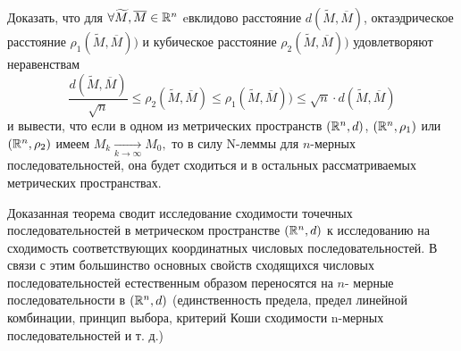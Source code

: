 \documentclass[../../main.tex]{subfiles}
\begin{document}
  \begin{exc}
    Доказать, что для $\forall \widetilde M, \overline{M} \in \mathbb{R}^n$ 
    eвклидово расстояние $d(\widetilde M, \overline{M})$, 
    октаэдрическое расстояние $\rho_1(\widetilde M, \overline{M}))$ 
    и кубическое расстояние $\rho_2(\widetilde M, \overline{M}))$ 
    удовлетворяют неравенствам
    \[
    \frac{d(\widetilde M, \overline{M})}{\sqrt{n}} \leq 
    \rho_2(\widetilde M, \overline{M}) \leq \rho_1(\widetilde M, 
    \overline{M})) \leq \sqrt{n}\cdot d(\widetilde M, \overline{M})
    \]
     и вывести, что если в одном из метрических пространств $(\mathbb{R}^n, 
     d)$, $(\mathbb{R}^n, \rho_1)$ или $(\mathbb{R}^n, \rho_2)$ имеем $M_k 
     \underset{k\rightarrow\infty}{\longrightarrow}  M_0,$ то в силу 
     N-леммы для $n$-мерных последовательностей, она будет сходиться 
     и в остальных рассматриваемых метрических пространствах.
  \end{exc}
  
  \begin{rem}
    Доказанная теорема сводит исследование сходимости точечных 
    последовательностей в метрическом пространстве $(\mathbb{R}^n, d)$ к 
    исследованию на сходимость соответствующих координатных числовых 
    последовательностей.
    В связи с этим большинство основных свойств сходящихся числовых 
    последовательностей естественным образом переносятся на $n$-
    мерные последовательности в $(\mathbb{R}^n, d)$
    (единственность предела, предел линейной комбинации, принцип 
    выбора, критерий Коши сходимости n-мерных последовательностей и 
    т. д.)
  \end{rem}
  
\end{document}
